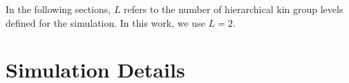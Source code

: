 

\dissertationexclude{\clearpage}
\dissertationexclude{\onecolumn}



\dissertationexclude{\clearpage}
\dissertationexclude{\twocolumn}






% 


In the following sections, $L$ refers to the number of hierarchical kin group levels defined for the simulation.
In this work, we use $L=2$.






\section{Simulation Details}
\label{sec:simulation-details}

\newenvironment{leveldown}%
  {\let\section\subsection%
   \let\subsection\subsubsection%
   \let\subsubsection\paragraph%
   \let\paragraph\subparagraph%
  }{}

